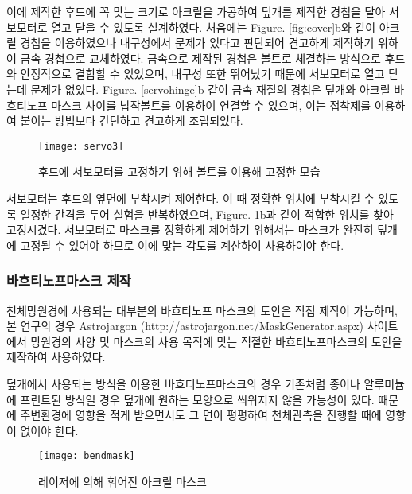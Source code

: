 이에 제작한 후드에 꼭 맞는 크기로 아크릴을 가공하여 덮개를 제작한 경첩을 달아 서보모터로 열고 닫을 수 있도록 설계하였다. 처음에는 \textrm{Figure}. \ref{fig:cover}b와 같이 아크릴 경첩을 이용하였으나 내구성에서 문제가 있다고 판단되어 견고하게 제작하기 위하여 금속 경첩으로 교체하였다. 금속으로 제작된 경첩은 볼트로 체결하는 방식으로 후드와 안정적으로 결합할 수 있었으며, 내구성 또한 뛰어났기 때문에 서보모터로 열고 닫는데 문제가 없었다. \textrm{Figure}. \ref{servohinge}b 같이 금속 재질의 경첩은 덮개와 아크릴 바흐티노프 마스크 사이를 납작볼트를 이용하여 연결할 수 있으며, 이는 접착제를 이용하여 붙이는 방법보다 간단하고 견고하게 조립되었다.


\begin{figure}[ht]
	\begin{center}
		\texttt{[image: servo3]}
	\end{center}
	\caption{후드에 서보모터를 고정하기 위해 볼트를 이용해 고정한 모습}
	\label{servo}
\end{figure}


서보모터는 후드의 옆면에 부착시켜 제어한다. 이 때 정확한 위치에 부착시킬 수 있도록 일정한 간격을 두어 실험을 반복하였으며, \textrm{Figure}. \ref{servo}b과 같이 적합한 위치를 찾아 고정시켰다. 서보모터로 마스크를 정확하게 제어하기 위해서는 마스크가 완전히 덮개에 고정될 수 있어야 하므로 이에 맞는 각도를 계산하여 사용하여야 한다.

\newpage
\subsubsection{바흐티노프마스크 제작}
천체망원경에 사용되는 대부분의 바흐티노프 마스크의 도안은 직접 제작이 가능하며, 본 연구의 경우 Astrojargon (http://astrojargon.net/MaskGenerator.aspx) 사이트에서 망원경의 사양 및 마스크의 사용 목적에 맞는 적절한 바흐티노프마스크의 도안을 제작하여 사용하였다.

덮개에서 사용되는 방식을 이용한 바흐티노프마스크의 경우 기존처럼 종이나 알루미늄에 프린트된 방식일 경우 덮개에 원하는 모양으로 씌워지지 않을 가능성이 있다. 때문에 주변환경에 영향을 적게 받으면서도 그 면이 평평하여 천체관측을 진행할 때에 영향이 없어야 한다. 

\begin{figure}[h]
	\begin{center}
		\texttt{[image: bendmask]}
	\end{center}
	\caption{레이저에 의해 휘어진 아크릴 마스크}
	\label{bendmask}
\end{figure}


